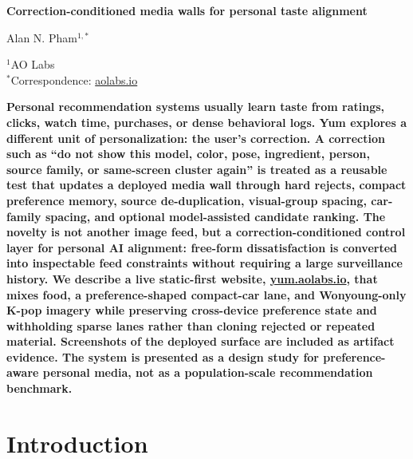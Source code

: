 \documentclass[12pt,letterpaper]{article}
\begin{document}
\linenumbers
\thispagestyle{empty}

\begin{center}
    \vspace*{-0.6em}

    {\fontsize{20}{22}\selectfont\bfseries\color{SumiInk}
    Correction-conditioned media walls for personal taste alignment\par}

    \vspace{0.95em}

    {\normalsize\color{SumiInk}
    Alan N. Pham$^{1,*}$\par}

    \vspace{0.38em}

    {\small\color{DustyTaupe}
    $^{1}$AO Labs\\
    $^{*}$Correspondence: \href{https://aolabs.io}{aolabs.io}\par}
\end{center}

\vspace{0.35em}
\noindent\textbf{Personal recommendation systems usually learn taste from ratings, clicks, watch time, purchases, or dense behavioral logs. Yum explores a different unit of personalization: the user's correction. A correction such as ``do not show this model, color, pose, ingredient, person, source family, or same-screen cluster again'' is treated as a reusable test that updates a deployed media wall through hard rejects, compact preference memory, source de-duplication, visual-group spacing, car-family spacing, and optional model-assisted candidate ranking. The novelty is not another image feed, but a correction-conditioned control layer for personal AI alignment: free-form dissatisfaction is converted into inspectable feed constraints without requiring a large surveillance history. We describe a live static-first website, \href{https://yum.aolabs.io}{yum.aolabs.io}, that mixes food, a preference-shaped compact-car lane, and Wonyoung-only K-pop imagery while preserving cross-device preference state and withholding sparse lanes rather than cloning rejected or repeated material. Screenshots of the deployed surface are included as artifact evidence. The system is presented as a design study for preference-aware personal media, not as a population-scale recommendation benchmark.}

\newpage
\pagestyle{fancy}

\section{Introduction}
\end{document}
